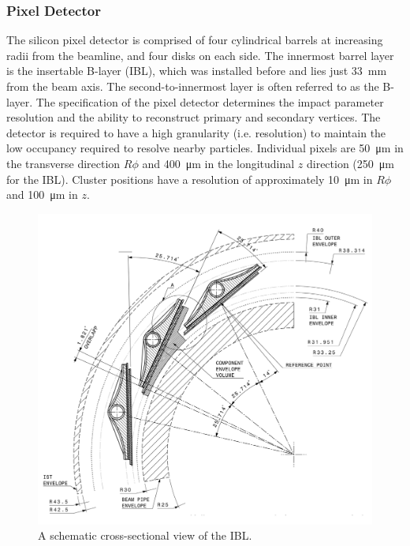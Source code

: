 \subsubsection{Pixel Detector}
The silicon pixel detector is comprised of four cylindrical barrels at increasing radii from the beamline, and four disks on each side.
The innermost barrel layer is the insertable B-layer (IBL), which was installed before \runtwo \cite{ATLAS-TDR-19,PIX-2018-001} and lies just \SI{33}{\milli\meter} from the beam axis.
The second-to-innermost layer is often referred to as the B-layer.
The specification of the pixel detector determines the impact parameter resolution and the ability to reconstruct primary and secondary vertices.
The detector is required to have a high granularity (i.e. resolution) to maintain the low occupancy required to resolve nearby particles. %
Individual pixels are \SI{50}{\micro\meter} in the transverse direction $R\phi$ and \SI{400}{\micro\meter} in the longitudinal $z$ direction (\SI{250}{\micro\meter} for the IBL).
Cluster positions have a resolution of approximately \SI{10}{\micro\meter} in $R\phi$ and \SI{100}{\micro\meter} in $z$.


\begin{figure}[!htpb]
  \centering
  \includegraphics[width=0.6\linewidth]{chapters/2.detector/figs/atlas_ibl.png}
  \caption{A schematic cross-sectional view of the \ATLAS IBL.}
  \label{fig:atlas_ibl}
\end{figure}


